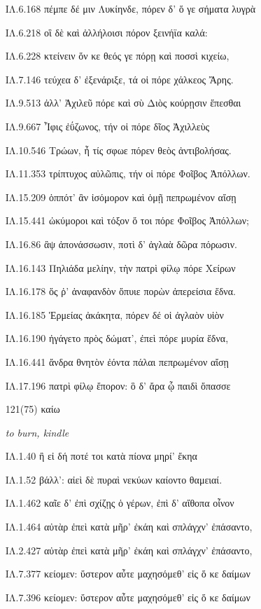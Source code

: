 \begin{enumerate}
{ΙΛ.6.168 πέμπε δέ μιν Λυκίηνδε, πόρεν δ' ὅ γε σήματα λυγρὰ

ΙΛ.6.218 οἳ δὲ καὶ ἀλλήλοισι πόρον ξεινήϊα καλά:

ΙΛ.6.228 κτείνειν ὅν κε θεός γε πόρῃ καὶ ποσσὶ κιχείω,

ΙΛ.7.146 τεύχεα δ' ἐξενάριξε, τά οἱ πόρε χάλκεος Ἄρης.

ΙΛ.9.513 ἀλλ' Ἀχιλεῦ πόρε καὶ σὺ Διὸς κούρῃσιν ἕπεσθαι

ΙΛ.9.667 Ἶφις ἐΰζωνος, τήν οἱ πόρε δῖος Ἀχιλλεὺς

ΙΛ.10.546 Τρώων, ἦ τίς σφωε πόρεν θεὸς ἀντιβολήσας.

ΙΛ.11.353 τρίπτυχος αὐλῶπις, τήν οἱ πόρε Φοῖβος Ἀπόλλων.

ΙΛ.15.209 ὁππότ' ἂν ἰσόμορον καὶ ὁμῇ πεπρωμένον αἴσῃ

ΙΛ.15.441 ὠκύμοροι καὶ τόξον ὅ τοι πόρε Φοῖβος Ἀπόλλων;

ΙΛ.16.86 ἂψ ἀπονάσσωσιν, ποτὶ δ' ἀγλαὰ δῶρα πόρωσιν.

ΙΛ.16.143 Πηλιάδα μελίην, τὴν πατρὶ φίλῳ πόρε Χείρων

ΙΛ.16.178 ὅς ῥ' ἀναφανδὸν ὄπυιε πορὼν ἀπερείσια ἕδνα.

ΙΛ.16.185 Ἑρμείας ἀκάκητα, πόρεν δέ οἱ ἀγλαὸν υἱὸν

ΙΛ.16.190 ἠγάγετο πρὸς δώματ', ἐπεὶ πόρε μυρία ἕδνα,

ΙΛ.16.441 ἄνδρα θνητὸν ἐόντα πάλαι πεπρωμένον αἴσῃ

ΙΛ.17.196 πατρὶ φίλῳ ἔπορον: ὃ δ' ἄρα ᾧ παιδὶ ὄπασσε

}

\clearpage
\item[\large 121(75)]{\large \g καίω}

\hspace{0.2cm} \textit{ to burn, kindle }

{\g
ΙΛ.1.40 ἢ εἰ δή ποτέ τοι κατὰ πίονα μηρί' ἔκηα

ΙΛ.1.52 βάλλ': αἰεὶ δὲ πυραὶ νεκύων καίοντο θαμειαί.

ΙΛ.1.462 καῖε δ' ἐπὶ σχίζῃς ὁ γέρων, ἐπὶ δ' αἴθοπα οἶνον

ΙΛ.1.464 αὐτὰρ ἐπεὶ κατὰ μῆρ' ἐκάη καὶ σπλάγχν' ἐπάσαντο,

ΙΛ.2.427 αὐτὰρ ἐπεὶ κατὰ μῆρ' ἐκάη καὶ σπλάγχν' ἐπάσαντο,

ΙΛ.7.377 κείομεν: ὕστερον αὖτε μαχησόμεθ' εἰς ὅ κε δαίμων

ΙΛ.7.396 κείομεν: ὕστερον αὖτε μαχησόμεθ' εἰς ὅ κε δαίμων

}
\end{enumerate}
